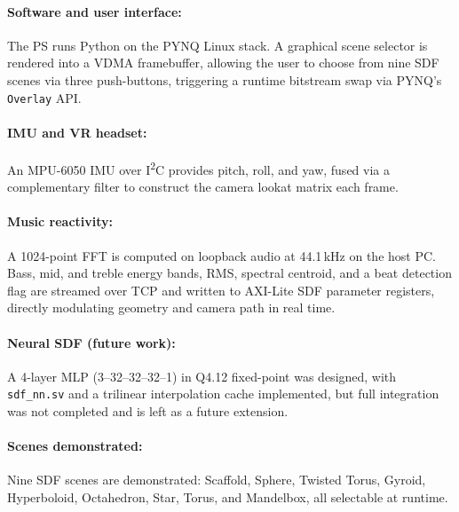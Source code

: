 \paragraph{Software and user interface: }
 The PS runs Python on the PYNQ Linux stack. A graphical scene selector is
rendered into a VDMA framebuffer, allowing the user to choose from nine SDF
scenes via three push-buttons, triggering a runtime bitstream swap via PYNQ's
\texttt{Overlay} API.

\paragraph{IMU and VR headset: }
 An MPU-6050 IMU over I\textsuperscript{2}C provides pitch, roll, and yaw,
fused via a complementary filter to construct the camera lookat matrix each
frame.

\paragraph{Music reactivity: } 
 A 1024-point FFT is computed on loopback audio at 44.1\,kHz on the host PC.
Bass, mid, and treble energy bands, RMS, spectral centroid, and a beat
detection flag are streamed over TCP and written to AXI-Lite SDF parameter
registers, directly modulating geometry and camera path in real time.

\paragraph{Neural SDF (future work): }
A 4-layer MLP (3--32--32--32--1) in Q4.12 fixed-point was designed, with
\texttt{sdf\_nn.sv} and a trilinear interpolation cache implemented, but full
integration was not completed and is left as a future extension.

\paragraph{Scenes demonstrated: }
Nine SDF scenes are demonstrated: Scaffold, Sphere, Twisted Torus, Gyroid,
Hyperboloid, Octahedron, Star, Torus, and Mandelbox, all selectable at runtime.

% 

